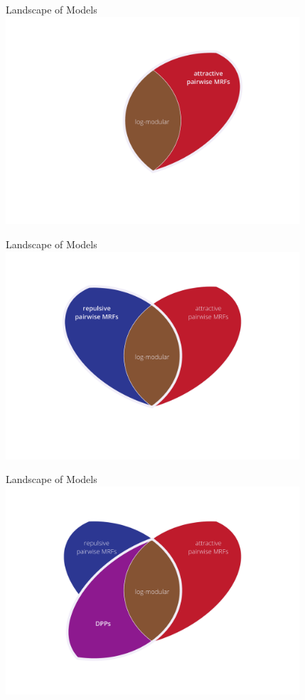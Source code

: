 \documentclass[mathserif]{beamer}
\begin{document}
\begin{frame}{Landscape of Models}
\centering
\includegraphics[width=4.3in]{figures/venn02.pdf}
\end{frame}

\begin{frame}{Landscape of Models}
\centering
\includegraphics[width=4.3in]{figures/venn03.pdf}
\end{frame}

\begin{frame}{Landscape of Models}
\centering
\includegraphics[width=4.3in]{figures/venn04.pdf}
\end{frame}
\end{document}
